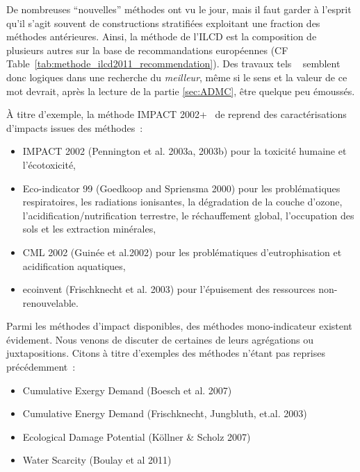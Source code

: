   De nombreuses ``nouvelles'' méthodes ont vu le jour, mais il faut garder à l'esprit qu'il s'agit souvent de constructions stratifiées exploitant une fraction des méthodes antérieures.
  Ainsi, la méthode de l'ILCD  est la composition de plusieurs autres sur la base de recommandations européennes (CF Table~\ref{tab:methode_ilcd2011_recommendation}).
  Des travaux tels ~\cite{hauschild_identifying_2013} semblent donc logiques dans une recherche du \emph{meilleur}, même si le sens et la valeur de ce mot devrait, après la lecture de la partie \ref{sec:ADMC}, être quelque peu émoussés.
  
    
  À titre d'exemple, la méthode IMPACT 2002+~\cite{jolliet_impact_2003} de \citeauthor{jolliet_impact_2003} reprend des caractérisations d'impacts issues des méthodes~:
  \begin{itemize} 
	\item IMPACT 2002 (Pennington et al. 2003a, 2003b) pour la toxicité humaine et l'écotoxicité,
	\item Eco-indicator 99 (Goedkoop and Spriensma 2000) pour les problématiques respiratoires, les radiations ionisantes, la dégradation de la couche d'ozone, l'acidification/nutrification terrestre, le réchauffement global, l'occupation des sols et les extraction minérales,
	\item CML 2002 (Guinée et al.2002) pour les problématiques d'eutrophisation et acidification aquatiques,
	\item ecoinvent (Frischknecht et al. 2003) pour l'épuisement des ressources non-renouvelable.
  \end{itemize}
  
    Parmi les méthodes d'impact disponibles, des méthodes mono-indicateur existent évidement.
    Nous venons de discuter de certaines de leurs agrégations ou juxtapositions.
    Citons à titre d'exemples des méthodes n'étant pas reprises  précédemment~:
    \begin{itemize}
     \item Cumulative Exergy Demand (Boesch et al. 2007)
     \item Cumulative Energy Demand (Frischknecht, Jungbluth, et.al. 2003)\cite{frischknecht_implementation_2007}
     \item Ecological Damage Potential (Köllner \& Scholz 2007)
     \item Water Scarcity (Boulay et al 2011)
    \end{itemize}
  
